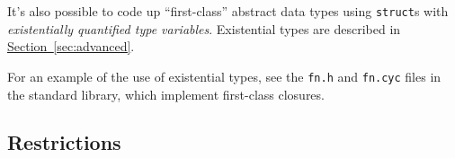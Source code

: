 It's also possible to code up ``first-class'' abstract data types
using \texttt{struct}s with \emph{existentially quantified type
  variables}.  Existential types are described in
\hyperref[{sec:advanced}]{Section~\ref{sec:advanced}}.

For an example of the use of existential types, see the \texttt{fn.h}
and \texttt{fn.cyc} files in the standard library, which implement
first-class closures.

\subsection{Restrictions}

